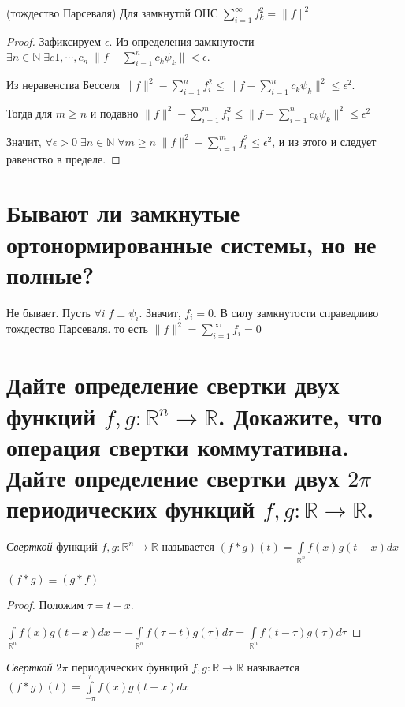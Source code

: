 \documentclass{article}
\begin{document}
	\begin{theorem} 
		(тождество Парсеваля) Для замкнутой ОНС  $\sum_{i=1}^{\infty} f_k^2 = \| f \|^2$ 
	\end{theorem}
	\begin{proof}
		Зафиксируем $\epsilon$.
		Из определения замкнутости $\exists n \in \mathbb{N} \; \exists c1, \cdots, c_n \; \| f-\sum_{i=1}^{n} c_k \psi_k\| < \epsilon$. 
		
		Из неравенства Бесселя $\|f\|^2-\sum_{i=1}^{n} f_i ^2 \le \| f-\sum_{i=1}^{n} c_k \psi_k\|^2 \le \epsilon^2$. 
		
		Тогда для $m \ge n$ и подавно $\|f\|^2-\sum_{i=1}^{m} f_i ^2 \le \| f-\sum_{i=1}^{n} c_k \psi_k\|^2 \le \epsilon^2$
		
		Значит, $\forall \epsilon > 0 \; \exists n \in \mathbb{N} \; \forall m \ge n \; \|f\|^2-\sum_{i=1}^{m} f_i ^2 \le \epsilon^2$, и из этого и следует равенство в пределе.
	\end{proof}
	
	\section{Бывают ли замкнутые ортонормированные системы, но не полные?}
	
	Не бывает. Пусть $\forall i \; f\perp \psi_i$. Значит, $f_i=0$. В силу замкнутости справедливо тождество Парсеваля. то есть $\|f\|^2=\sum_{i=1}^{\infty}f_i=0$
	
	\section{Дайте определение свертки двух функций $f, g: \mathbb{R}^n \to \mathbb{R}$. Докажите, что операция свертки коммутативна. Дайте определение свертки двух $2\pi$ периодических функций $f, g: \mathbb{R} \to \mathbb{R}$.}
	
	\begin{definition}
		\textit{Сверткой} функций $f, g: \mathbb{R}^n \to \mathbb{R}$ называется $(f*g)(t)=\int\limits_{\mathbb{R}^n} f(x)g(t-x)dx$
	\end{definition}

	\begin{theorem} 
		$(f*g) \equiv (g*f)$ 
	\end{theorem}
	\begin{proof}
		Положим $\tau=t-x$.
		
		$\int\limits_{\mathbb{R}^n} f(x)g(t-x)dx=-\int\limits_{\mathbb{R}^n} f(\tau-t)g(\tau)d\tau=\int\limits_{\mathbb{R}^n} f(t-\tau)g(\tau)d\tau$
	\end{proof}
	\begin{definition}
		\textit{Сверткой} $2\pi$ периодических функций $f, g: \mathbb{R} \to \mathbb{R}$ называется $(f*g)(t)=\int\limits_{-\pi}^{\pi} f(x)g(t-x)dx$
	\end{definition}
	
\end{document}
